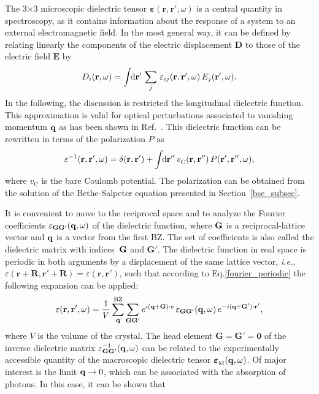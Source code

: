 The 3$\times$3 microscopic dielectric tensor $\boldsymbol{\varepsilon}(\mathbf{r,r'},\omega)$  is a central quantity in spectroscopy, as it contains information about the response of a system to an external electromagnetic field. In the most general way, it can be defined by relating linearly the components of the electric displacement $\mathbf{D}$ to those of the electric field $\mathbf{E}$ by 
%
\begin{equation}
    D_i(\mathbf{r},\omega) = \int\text{\!\!d}\mathbf{r'}\,\sum_j\,\varepsilon_{ij}(\mathbf{r,r'},\omega)\,E_j(\mathbf{r'},\omega).
\end{equation}
%
In the following, the discussion is restricted the longitudinal dielectric function. This approximation is valid for optical perturbations associated to vanishing momentum $\mathbf{q}$ as has been shown in  Ref.~\cite{delsole_fiorino}. This dielectric function can be rewritten in terms of the polarization $P$ as
%
\begin{equation}\label{diel_pol}
    \varepsilon^{-1}(\mathbf{r,r'},\omega) = \delta(\mathbf{r,r'}) + \int\text{\!\!d}\mathbf{r''}\,v_\text{C}^{\phantom{I}}(\mathbf{r,r''})\,P(\mathbf{r',r''},\omega),
\end{equation}
%
where $v_\text{C}^{\phantom{I}}$ is the bare Coulomb potential. The polarization can be obtained from the solution of the Bethe-Salpeter equation presented in Section~\ref{bse_subsec}.\par 
It is convenient to move to the reciprocal space and to analyze the Fourier coefficients $\varepsilon_\mathbf{GG'}(\mathbf{q},\omega)$ of the dielectric function, where $\mathbf{G}$ is a reciprocal-lattice vector and $\mathbf{q}$ is a vector from the first BZ. The set of coefficients is also called the dielectric matrix with indices~$\mathbf{G}$ and $\mathbf{G'}$. The dielectric function in real space is periodic in both arguments by a displacement of the same lattice vector, \textit{i.e.}, $\varepsilon(\mathbf{r+R,r'+R})=\varepsilon(\mathbf{r,r'})$, such that according to Eq.\;\eqref{fourier_periodic} the following expansion can be applied:
\begin{equation}
    \varepsilon(\mathbf{r,r'},\omega) = \frac{1}{V}\sum_{\mathbf{q}}^\text{BZ}\sum_\mathbf{GG'}e^{i\mathbf{(q+G)\cdot r}}\,\varepsilon_\mathbf{GG'}(\mathbf{q},\omega)\,e^{-i\mathbf{(q+G')\cdot r'}},
\end{equation}
%
where $V$ is the volume of the crystal. The head element $\mathbf{G=G'=0}$ of the inverse dielectric matrix $\varepsilon^{-1}_\mathbf{GG'}(\mathbf{q},\omega)$ can be related to the experimentally accessible quantity of the macroscopic dielectric tensor $ \boldsymbol{\varepsilon}^{\phantom{I}}_\text{M}(\mathbf{q},\omega)$. Of major interest is the limit $\mathbf{q}\rightarrow 0$, which can be associated with the absorption of photons. In this case, it can be shown that \cite{gonze_lee} 
